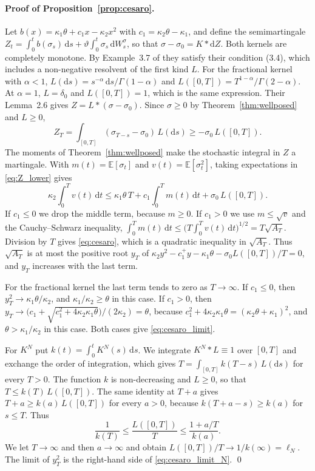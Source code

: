 \documentclass[11pt,a4paper]{article}
\theoremstyle{definition}
\newcommand{\D}{\mathrm{d}}
\newcommand{\E}{\mathbb{E}}
\begin{document}
\paragraph{Proof of Proposition~\ref{prop:cesaro}.} Let $b(x)=\kappa_1\theta+c_1x-\kappa_2x^2$ with $c_1=\kappa_2\theta-\kappa_1$, and define the semimartingale $Z_t=\int_0^tb(\sigma_s)\,\D s+\vartheta\int_0^t\sigma_s\,\D W^\sigma_s$, so that $\sigma-\sigma_0=K*\D Z$. Both kernels are completely monotone. By Example~3.7 of \citet{AbiJaberLarssonPulido2019} they satisfy their condition (3.4), which includes a non-negative resolvent of the first kind $L$. For the fractional kernel with $\alpha<1$, $L(\D s)=s^{-\alpha}\,\D s/\Gamma(1-\alpha)$ and $L([0,T])=T^{1-\alpha}/\Gamma(2-\alpha)$. At $\alpha=1$, $L=\delta_0$ and $L([0,T])=1$, which is the same expression. Their Lemma~2.6 gives $Z=L*(\sigma-\sigma_0)$. Since $\sigma\ge0$ by Theorem~\ref{thm:wellposed} and $L\ge0$,
\begin{equation}\label{eq:Z_lower}
Z_T=\int_{[0,T]}(\sigma_{T-s}-\sigma_0)\,L(\D s)\ge-\sigma_0\,L([0,T]) .
\end{equation}
The moments of Theorem~\ref{thm:wellposed} make the stochastic integral in $Z$ a martingale. With $m(t)=\E[\sigma_t]$ and $v(t)=\E[\sigma_t^2]$, taking expectations in \eqref{eq:Z_lower} gives
\begin{equation*}
\kappa_2\int_0^Tv(t)\,\D t\le\kappa_1\theta\,T+c_1\int_0^Tm(t)\,\D t+\sigma_0\,L([0,T]) .
\end{equation*}
If $c_1\le0$ we drop the middle term, because $m\ge0$. If $c_1>0$ we use $m\le\sqrt v$ and the Cauchy--Schwarz inequality, $\int_0^Tm(t)\,\D t\le\big(T\int_0^Tv(t)\,\D t\big)^{1/2}=T\sqrt{A_T}$. Division by $T$ gives \eqref{eq:cesaro}, which is a quadratic inequality in $\sqrt{A_T}$. Thus $\sqrt{A_T}$ is at most the positive root $y_T$ of $\kappa_2y^2-c_1^+y-\kappa_1\theta-\sigma_0L([0,T])/T=0$, and $y_T$ increases with the last term.

For the fractional kernel the last term tends to zero as $T\to\infty$. If $c_1\le0$, then $y_T^2\to\kappa_1\theta/\kappa_2$, and $\kappa_1/\kappa_2\ge\theta$ in this case. If $c_1>0$, then $y_T\to\big(c_1+\sqrt{c_1^2+4\kappa_2\kappa_1\theta}\big)/(2\kappa_2)=\theta$, because $c_1^2+4\kappa_2\kappa_1\theta=(\kappa_2\theta+\kappa_1)^2$, and $\theta>\kappa_1/\kappa_2$ in this case. Both cases give \eqref{eq:cesaro_limit}.

For $K^N$ put $k(t)=\int_0^tK^N(s)\,\D s$. We integrate $K^N*L\equiv1$ over $[0,T]$ and exchange the order of integration, which gives $T=\int_{[0,T]}k(T-s)\,L(\D s)$ for every $T>0$. The function $k$ is non-decreasing and $L\ge0$, so that $T\le k(T)\,L([0,T])$. The same identity at $T+a$ gives $T+a\ge k(a)\,L([0,T])$ for every $a>0$, because $k(T+a-s)\ge k(a)$ for $s\le T$. Thus
\begin{equation*}
\frac{1}{k(T)}\le\frac{L([0,T])}{T}\le\frac{1+a/T}{k(a)} .
\end{equation*}
We let $T\to\infty$ and then $a\to\infty$ and obtain $L([0,T])/T\to1/k(\infty)=\ell_N$. The limit of $y_T^2$ is the right-hand side of \eqref{eq:cesaro_limit_N}. \qed
\end{document}
